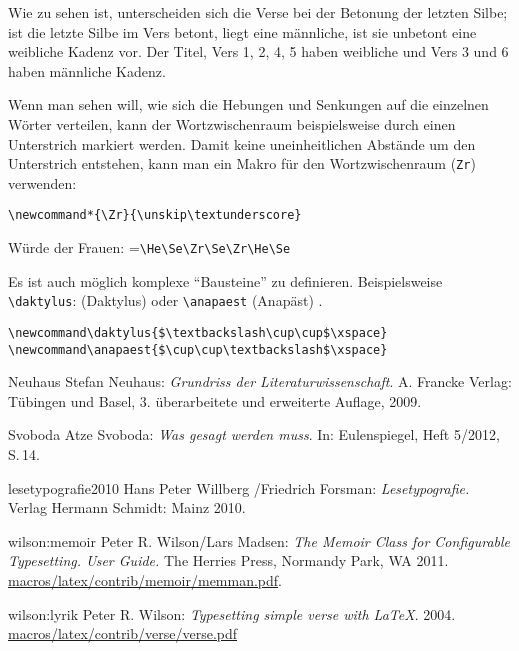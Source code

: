 Wie zu sehen ist, unterscheiden sich die Verse bei der Betonung der letzten 
Silbe; ist die letzte Silbe im Vers betont, liegt eine männliche, ist sie unbetont
eine weibliche Kadenz
vor. Der Titel, Vers 1, 2, 4, 5 haben weibliche und Vers 3 und 6 haben 
männliche Kadenz.

Wenn man sehen will, wie sich die Hebungen und Senkungen auf die
einzelnen Wörter verteilen, kann der Wortzwischenraum beispielsweise
durch einen Unterstrich markiert werden. Damit keine uneinheitlichen Abstände 
um den Unterstrich entstehen, kann man ein Makro für
den Wortzwischenraum (\verb|Zr|) verwenden:

\verb|\newcommand*{\Zr}{\unskip\textunderscore}|

Würde der Frauen: \He\Se\Zr\Se\Zr\He\Se =\verb|\He\Se\Zr\Se\Zr\He\Se|



Es ist auch möglich komplexe "`Bausteine"' zu definieren. Beispielsweise
\verb|\daktylus|: \daktylus{} (Daktylus) oder \verb|\anapaest| (Anapäst) 
\anapaest.

\begin{lstlisting}
\newcommand\daktylus{$\textbackslash\cup\cup$\xspace} 
\newcommand\anapaest{$\cup\cup\textbackslash$\xspace} 
\end{lstlisting}

\small
\begin{thebibliography}{1000}
\bibitem
{Neuhaus} Stefan Neuhaus:
\textsl{Grundriss der Literaturwissenschaft}. 
A. Francke Verlag: Tübingen und Basel, 3. überarbeitete und erweiterte Auf\/lage, 
2009.

\bibitem
{Svoboda} Atze Svoboda:
\textsl{Was gesagt werden muss}.
In: Eulenspiegel, Heft 5/2012, S.\,14.

\bibitem
{lesetypografie2010} Hans Peter Willberg /Friedrich Forsman:
\textsl{Lesetypografie.}
Verlag Hermann Schmidt: Mainz 2010.

\bibitem
{wilson:memoir} Peter R. Wilson/Lars Madsen:
\textsl{The Memoir Class for Configurable Typesetting. User Guide.}
The Herries Press, Normandy Park, WA 2011.
\url{macros/latex/contrib/memoir/memman.pdf}.

\bibitem
{wilson:lyrik} Peter R. Wilson:
\textsl{Typesetting simple verse with \LaTeX }. 2004.
\url{macros/latex/contrib/verse/verse.pdf}
\end{thebibliography}

%



%
